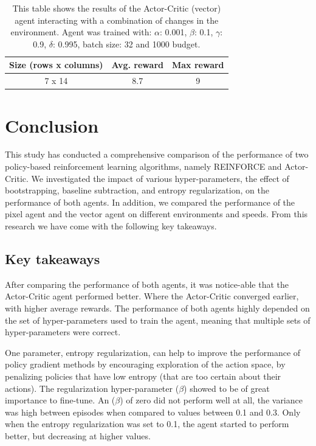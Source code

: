 \documentclass{article}
\begin{document}
\begin{table}[]
    \centering
    \begin{tabular}{|c|c|c|}
        \hline
        \textbf{Size (rows x columns)} & \textbf{Avg. reward} & \textbf{Max reward} \\
        \hline
        7 x 14                & 8.7         & 9    \\ 
        \hline              
    \end{tabular}
    \caption{This table shows the results of the Actor-Critic (vector) agent interacting with a combination of changes in the environment. 
    Agent was trained with: $\alpha$: 0.001, $\beta$: 0.1, $\gamma$: 0.9, $\delta$: 0.995, batch size: 32 and 1000 budget. }
    \label{tab:Vector-comb}
\end{table}


\section{Conclusion}
\label{Conclusion}

This study has conducted a comprehensive comparison of the performance of two policy-based reinforcement learning algorithms, namely REINFORCE and Actor-Critic.
We investigated the impact of various hyper-parameters, the effect of bootstrapping, baseline subtraction, and entropy regularization, on the performance of both agents. 
In addition, we compared the performance of the pixel agent and the vector agent on different environments and speeds. 
From this research we have come with the following key takeaways.

\subsection{Key takeaways} %
\label{C-Takeaways}
After comparing the performance of both agents, it was notice-able that the Actor-Critic agent performed better. 
Where the Actor-Critic converged earlier, with higher average rewards.
The performance of both agents highly depended on the set of hyper-parameters used to train the agent, meaning that multiple sets of hyper-parameters were correct. 

One parameter, entropy regularization, can help to improve the performance of policy gradient methods by encouraging exploration of the action space, by penalizing policies that have low entropy (that are too certain about their actions).
The regularization hyper-parameter ($\beta$) showed to be of great importance to fine-tune. 
An ($\beta$) of zero did not perform well at all, the variance was high between episodes when compared to values between 0.1 and 0.3. 
Only when the entropy regularization was set to 0.1, the agent started to perform better, but decreasing at higher values.
\end{document}
